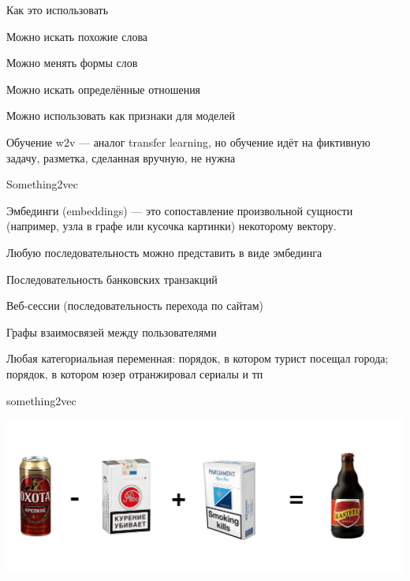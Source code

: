 \documentclass[notes,12pt, aspectratio=169]{beamer}
\newenvironment{wideitemize}{\itemize\addtolength{\itemsep}{10pt}}{\enditemize}
\begin{document}
\begin{frame}{Как это использовать}
\begin{wideitemize} 
	\item Можно искать похожие слова
	
	\item  Можно менять формы слов
	
	\item  Можно искать определённые отношения
	
	\item  Можно использовать как признаки для моделей
	
	\item  Обучение w2v — аналог transfer learning, но обучение идёт на фиктивную задачу, разметка, сделанная вручную, не нужна
\end{wideitemize} 
\end{frame} 


\begin{frame}{Something2vec}
		\begin{wideitemize} 
			\item \alert{Эмбединги (embeddings)} — это сопоставление произвольной сущности (например, узла в графе или кусочка картинки) некоторому вектору.
			
			\item  Любую последовательность можно представить в виде эмбединга
			
			\item  Последовательность банковских транзакций
			
			\item  Веб-сессии (последовательность перехода по сайтам)
			
			\item Графы взаимосвязей между пользователями 
			
			\item Любая категориальная переменная: порядок, в котором турист посещал города; порядок, в котором юзер отранжировал сериалы и тп
		\end{wideitemize} 
\end{frame} 


\begin{frame}{something2vec}
	\begin{center}
		\includegraphics[width=.8\linewidth]{smth2vec.png}
	\end{center}
\end{frame} 
\end{document}
